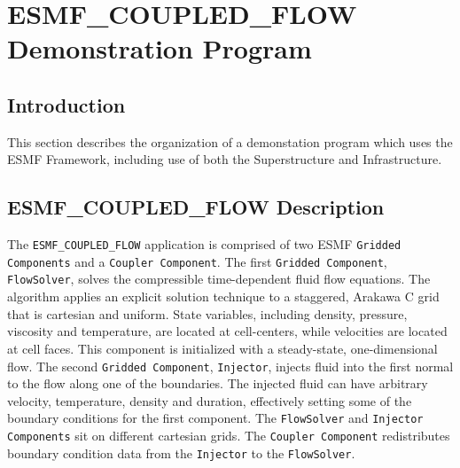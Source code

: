 
\section{ESMF\_COUPLED\_FLOW Demonstration Program}
\label{sec:demo}

\subsection{Introduction}

This section describes the organization of a
demonstation program which uses the ESMF Framework,
including use of both the 
Superstructure and Infrastructure.

\subsection{ESMF\_COUPLED\_FLOW Description}
 
The {\tt ESMF\_COUPLED\_FLOW} application is comprised of two ESMF 
{\tt Gridded Components} and a {\tt Coupler Component}.  
The first {\tt Gridded Component}, {\tt FlowSolver}, solves the compressible 
time-dependent fluid flow equations.  The algorithm 
applies an explicit solution technique to a staggered, Arakawa C grid 
that is cartesian and uniform.  State variables, including density, 
pressure, viscosity and temperature, are located at cell-centers, while 
velocities are located at cell faces.  This component is initialized 
with a steady-state, one-dimensional flow.  The second {\tt Gridded 
Component}, {\tt Injector}, injects fluid into the first normal to the 
flow along 
one of the boundaries.  The injected fluid can have arbitrary velocity, 
temperature, density and duration, effectively setting some of 
the boundary conditions for the first component.  The {\tt FlowSolver} and 
{\tt Injector Components} sit on different cartesian grids.  The
{\tt Coupler Component} redistributes boundary condition data from 
the {\tt Injector} to the {\tt FlowSolver}.


